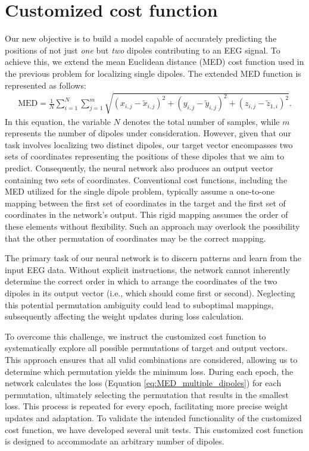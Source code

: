 \documentclass[a4paper, UKenglish, 11pt]{uiomaster}
\begin{document}
\section{Customized cost function}
Our new objective is to build a model capable of accurately predicting the positions of not just \emph{one} but \emph{two} dipoles contributing to an EEG signal. To achieve this, we extend the mean Euclidean distance (MED) cost function used in the previous problem for localizing single dipoles. The extended MED function is represented as follows:
\begin{equation}
  \begin{aligned}
    \text{MED}
      = \frac{1}{N} \sum_{i=1}^{N} \sum_{j=1}^{m}
        \sqrt{(x_{i,j} - \tilde{x}_{i,j})^2 + (y_{i,j} - \tilde{y}_{i,j})^2 + (z_{i,j} - \tilde{z}_{1,i})^2}.
  \end{aligned}
\label{eq:MED_multiple_dipoles}
\end{equation}
In this equation, the variable $N$ denotes the total number of samples, while $m$ represents the number of dipoles under consideration. However, given that our task involves localizing two distinct dipoles, our target vector encompasses two sets of coordinates representing the positions of these dipoles that we aim to predict. Consequently, the neural network also produces an output vector containing two sets of coordinates. Conventional cost functions, including the MED utilized for the single dipole problem, typically assume a one-to-one mapping between the first set of coordinates in the target and the first set of coordinates in the network's output. This rigid mapping assumes the order of these elements without flexibility. Such an approach may overlook the possibility that the other permutation of coordinates may be the correct mapping.

The primary task of our neural network is to discern patterns and learn from the input EEG data. Without explicit instructions, the network cannot inherently determine the correct order in which to arrange the coordinates of the two dipoles in its output vector (i.e., which should come first or second). Neglecting this potential permutation ambiguity could lead to suboptimal mappings, subsequently affecting the weight updates during loss calculation.

To overcome this challenge, we instruct the customized cost function to systematically explore all possible permutations of target and output vectors. This approach ensures that all valid combinations are considered, allowing us to determine which permutation yields the minimum loss. During each epoch, the network calculates the loss (Equation \ref{eq:MED_multiple_dipoles}) for each permutation, ultimately selecting the permutation that results in the smallest loss. This process is repeated for every epoch, facilitating more precise weight updates and adaptation. To validate the intended functionality of the customized cost function, we have developed several unit tests. This customized cost function is designed to accommodate an arbitrary number of dipoles.
\end{document}
